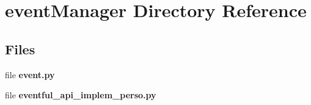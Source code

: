 \section{event\+Manager Directory Reference}
\label{dir_b8c199a8c600efd6bf338ef1eaa2e27d}
\subsection*{Files}
\begin{DoxyCompactItemize}
\item 
file {\bf event.\+py}
\item 
file {\bf eventful\+\_\+api\+\_\+implem\+\_\+perso.\+py}
\end{DoxyCompactItemize}

